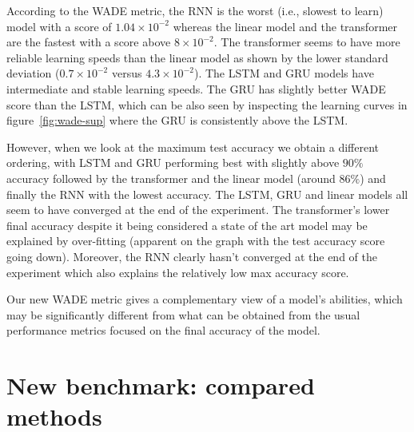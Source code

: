 According to the WADE metric, the RNN is the worst (i.e., slowest to learn) model
with a score of $1.04 \times 10^{-2}$ whereas the linear model and the transformer
are the fastest with a score above $8 \times 10^{-2}$. The transformer seems to have
more reliable learning speeds than the linear model as shown by the lower
standard deviation ($0.7\times 10 ^{-2}$ versus $4.3 \times 10^{-2}$). The LSTM and GRU
models have intermediate and stable learning speeds.
The GRU has slightly better WADE score than the LSTM, which can be also seen by inspecting the learning curves in figure~\ref{fig:wade-sup} where the GRU is consistently above the LSTM.

However, when we look at the maximum test accuracy we obtain a different ordering,
with LSTM and GRU performing best with slightly above $90\%$ accuracy followed by the
transformer and the linear model (around $86\%$) and finally the RNN with the lowest
accuracy. The LSTM, GRU and linear models all seem to have converged at the end
of the experiment. The transformer's lower final accuracy despite it being
considered a state of the art model may be explained by over-fitting (apparent
on the graph with the test accuracy score going down). Moreover, the RNN clearly
hasn't converged at the end of the experiment which also explains the relatively
low max accuracy score.

Our new WADE metric gives a complementary view of a model's abilities, which may be significantly different from what can be obtained from the usual
performance metrics focused on the final accuracy of the model.


\section{New benchmark: compared methods\label{sec:compared-methods}}

